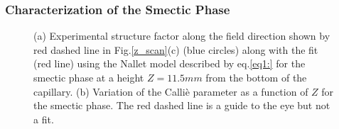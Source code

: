 \documentclass[aps,prl,preprint,superscriptaddress]{revtex4-1} %
\begin{document}
\subsubsection{Characterization of the Smectic Phase}
\begin{figure}[ht]
\caption{(a) Experimental structure factor along the field direction shown by red dashed line in Fig.\ref{z_scan}(c) (blue circles) along with the fit (red line) using the Nallet model described by eq.\ref{eq1:} for the smectic phase at a height $Z=11.5mm$ from the bottom of the capillary. (b) Variation of the Calli\`{e} parameter as a function of $Z$ for the smectic phase. The red dashed line is a guide to the eye but not a fit.}\label{callie}
\end{figure}
\end{document}
